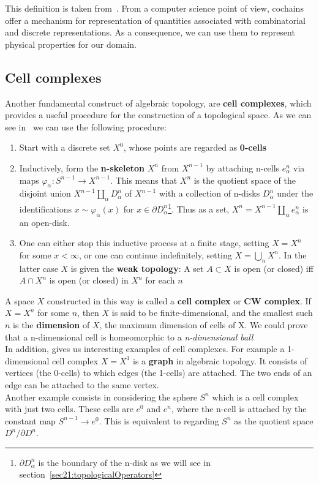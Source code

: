 This definition is taken from~\cite{Hatcher}.
From a computer science point of view, cochains offer a mechanism for representation of quantities associated with combinatorial and discrete representations. As a consequence, we can use them to represent physical properties for our domain.


\subsection{Cell complexes}

Another fundamental construct of algebraic topology, are \textbf{cell complexes}, which provides a useful procedure for the construction of a topological space. As we can see in~\cite{Hatcher} we can use the following procedure:
\begin{enumerate}
 \item Start with a discrete set $X^{0}$, whose points are regarded as \textbf{0-cells}
 \item Inductively, form the \textbf{n-skeleton} $X^{n}$ from $X^{n - 1}$ by attaching n-cells $e^{n}_{\alpha}$ via maps $\varphi_{\alpha} \colon S^{n-1} \rightarrow X^{n-1}$. This means that $X^{n}$ is the quotient space of the disjoint union $X^{n-1} \coprod_{\alpha}D^{n}_{\alpha}$ of $X^{n-1}$ with a collection of n-disks $D^{n}_{\alpha}$ under the identifications $x \sim  \varphi_{\alpha}(x)$ for $x \in \partial D^{n}_{\alpha}$\footnote{$\partial D^{n}_{\alpha}$ is the boundary of the n-disk as we will see in section~\ref{sec21:topologicalOperators}}. Thus as a set, $X^{n} = X^{n-1}\coprod_{\alpha}e^{n}_{\alpha}$ is an open-disk.
 \item One can either stop this inductive process at a finite stage, setting $X = X^{n}$ for some $x < \infty$, or one can continue indefinitely, setting $X = \bigcup_{n}X^{n}$. In the latter case $X$ is given the \textbf{weak topology}: A set $A \subset X$ is open (or closed) iff $A \cap X^{n}$ is open (or closed) in $X^{n}$ for each $n$
\end{enumerate}

A space $X$ constructed in this way is called a \textbf{cell complex} or \textbf{CW complex}. If $X = X^{n}$ for some $n$, then $X$ is said to be finite-dimensional, and the smallest such $n$ is the \textbf{dimension} of $X$, the maximum dimension of cells of X. We could prove that a n-dimensional cell is homeomorphic to a \textit{n-dimensional ball}\\

In addition, \cite{Hatcher} gives us interesting examples of cell complexes. For example a 1-dimensional cell complex $X = X^{1}$ is a \textbf{graph} in algebraic topology. It consists of vertices (the 0-cells) to which edges (the 1-cells) are attached. The two ends of an edge can be attached to the same vertex.\\
Another example consists in considering the sphere $S^{n}$ which is a cell complex with just two cells. These cells are $e^{0}$ and $e^{n}$, where the n-cell is attached by the constant map $S^{n-1} \rightarrow e^{0}$. This is equivalent to regarding $S^{n}$ as the quotient space $D^{n}/\partial D^{n}$.\\

